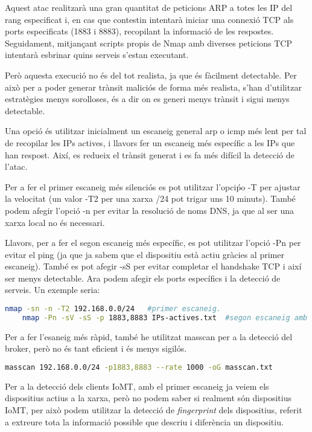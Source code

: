 Aquest atac realitzarà una gran quantitat de peticions ARP a totes les IP del rang especificat i, en cas que contestin intentarà iniciar una connexió TCP als ports especificats (1883 i 8883), recopilant la informació de les respostes. Seguidament, mitjançant scripts propis de Nmap amb diverses peticions TCP intentarà esbrinar quins serveis s'estan executant.  

Però aquesta execució no és del tot realista, ja que és fàcilment detectable. Per això per a poder generar trànsit maliciós de forma més realista, s'han d'utilitzar estratègies menys sorolloses, és a dir on es generi menys trànsit i sigui menys detectable.

Una opció és utilitzar inicialment un escaneig general arp o icmp més lent per tal de recopilar les IPs actives, i llavors fer un escaneig més específic a les IPs que han respost. Així, es redueix el trànsit generat i es fa més difícil la detecció de l'atac.

Per a fer el primer escaneig més silenciós es pot utilitzar l'opciṕo -T per ajustar la velocitat (un valor -T2 per una xarxa /24 pot trigar uns 10 minuts). També podem afegir l'opció -n per evitar la resolució de noms DNS, ja que al ser una xarxa local no és necessari. 

Llavors, per a fer el segon escaneig més específic, es pot utilitzar l'opció -Pn per evitar el ping (ja que ja sabem que el dispositiu està actiu gràcies al primer escaneig). També es pot afegir -sS per evitar completar el handshake TCP i així ser menys detectable. Ara podem afegir els ports específics i la detecció de serveis. Un exemple seria: 
\begin{lstlisting}[language=bash, caption={Escaneig en dos fases}, label=Escaneig en dos fases]
    nmap -sn -n -T2 192.168.0.0/24   #primer escaneig.
    nmap -Pn -sV -sS -p 1883,8883 IPs-actives.txt  #segon escaneig amb la llista d'IPs actives obtinguda del primer escaneig.
\end{lstlisting}

Per a fer l'esaneig més ràpid, també he utilitzat masscan per a la detecció del broker, però no és tant eficient i és menys sigilós.

\begin{lstlisting}[language=bash, caption={Escaneig Masscan}, label=Escaneig Masscan]
    masscan 192.168.0.0/24 -p1883,8883 --rate 1000 -oG masscan.txt
\end{lstlisting}

Per a la detecció dels clients IoMT, amb el primer escaneig ja veiem els dispositius actius a la xarxa, però no podem saber si realment són dispositius IoMT, per això podem utilitzar la detecció de \textit{fingerprint} dels dispositius, referit a extreure tota la informació possible que descriu i diferència un dispositiu. 

